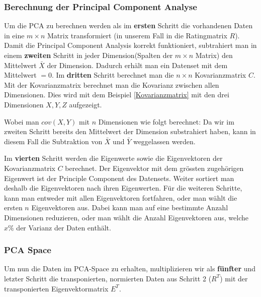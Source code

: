 \subsubsection{Berechnung der Principal Component Analyse}
\label{sec: Berechnung PCA}

Um die PCA zu berechnen werden als im \textbf{ersten} Schritt die vorhandenen Daten in eine $m\times n$ Matrix transformiert (in unserem Fall in die Ratingmatrix $R$). Damit die Principal Component Analysis korrekt funktioniert, subtrahiert man in einem \textbf{zweiten} Schritt in jeder Dimension(Spalten der $m \times n$ Matrix) den Mittelwert $\bar{X}$ der Dimension.  Dadurch erhält man ein Datenset mit dem Mittelwert $= 0$.
Im \textbf{dritten} Schritt berechnet man die $n\times n$ Kovarianzmatrix $C$. Mit der Kovarianzmatrix berechnet man die Kovarianz zwischen allen Dimensionen. Dies wird mit dem Beispiel \eqref{Kovarianzmatrix} mit den drei Dimensionen $X,Y,Z$ aufgezeigt.


Wobei man ${cov}(X,Y)$ mit $n$ Dimensionen wie folgt berechnet:
Da wir im zweiten Schritt bereits den Mittelwert der Dimension substrahiert haben, kann in diesem Fall die Subtraktion von $\bar{X}$ und $\bar{Y}$ weggelassen werden.

Im \textbf{vierten} Schritt werden die Eigenwerte sowie die Eigenvektoren der Kovarianzmatrix $C$ berechnet.
Der Eigenvektor mit dem grössten zugehörigen Eigenwert ist der Principle Component des Datensets. Weiter sortiert man deshalb die Eigenvektoren nach ihren Eigenwerten.
Für die weiteren Schritte, kann man entweder mit allen Eigenvektoren fortfahren, oder man wählt die ersten $n$ Eigenvektoren aus. Dabei kann man auf eine bestimmte Anzahl Dimensionen reduzieren, oder man wählt die Anzahl Eigenvektoren aus, welche $x\%$ der Varianz der Daten enthält.
\subsubsection{PCA Space}
Um nun die Daten im PCA-Space zu erhalten, multiplizieren wir als \textbf{fünfter} und letzter Schritt die transponierten, normierten Daten aus Schritt 2 ($R^T$) mit der transponierten Eigenvektormatrix $E^T$. 



